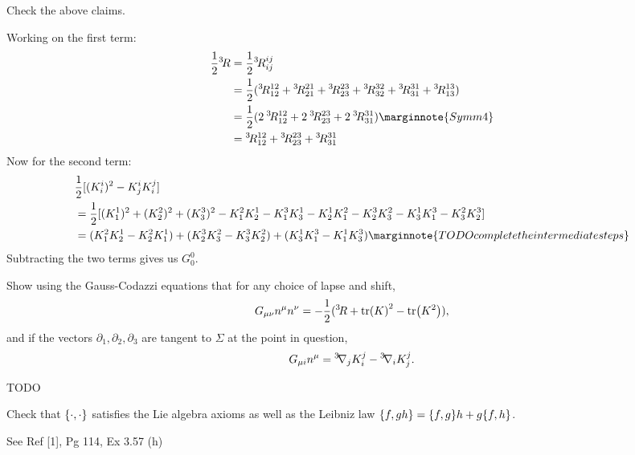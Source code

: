 \documentclass[10pt]{article}
\begin{document}
\begin{example}
	Check the above claims.
\end{example}
\sol Working on the first term:
$$
\begin{aligned}
	\frac12 \nt R &= \frac12 \nt R_{ij}^{ij}\\
	&= \frac12 (\nt R_{12}^{12} + \nt R_{21}^{21} + \nt R_{23}^{23} + \nt R_{32}^{32} + \nt R_{31}^{31} + \nt R_{13}^{13})\\
	&= \frac12 (2 \:\nt R_{12}^{12} + 2 \:\nt R_{23}^{23} + 2 \:\nt R_{31}^{31})\marginnote{Symm 4}\\
	&= \nt R_{12}^{12} + \nt R_{23}^{23} + \nt R_{31}^{31}\\
\end{aligned}
$$
Now for the second term:
$$
\begin{aligned}
	&\frac12[(K_i^i)^2 - K_j^iK_i^j]\\
	&= \frac12[(K_1^1)^2 + (K_2^2)^2 + (K_3^3)^2 - K_1^2K_2^1 - K_1^3K_3^1 - K_2^1K_1^2 - K_2^3K_3^2 - K_3^1K_1^3 - K_3^2K_2^3]\\
	&= (K_1^2K_2^1 - K_2^2K_1^1) + (K_2^3K_3^2 - K_3^3K_2^2) + (K_3^1K_1^3 - K_1^1K_3^3)\marginnote{TODO complete the intermediate steps}
\end{aligned}
$$
Subtracting the two terms gives us $G_0^0$.


\label{b3e46}\begin{example}
	Show using the Gauss-Codazzi equations that for any choice of lapse and shift,
	$$
	G_{\mu\nu}n^\mu n^\nu = -\frac12({}^3\! R + \tr(K)^2 - \tr(K^2)),
	$$
	and if the vectors $\partial_1,\partial_2,\partial_3$ are tangent to $\Sigma$ at the point in question,
	$$
	G_{\mu i}n^\mu = {}^3\!\nabla_j K_i^j - {}^3\!\nabla_i K_j^j.
	$$
\end{example}
\sol TODO


\begin{example}
	Check that $\lbrace\cdot,\cdot\rbrace$ satisfies the Lie algebra axioms as well as the Leibniz law $\lbrace f,gh\rbrace = \lbrace f,g\rbrace h+g\lbrace f,h\rbrace$.
\end{example}
\sol See Ref [1], Pg 114, Ex 3.57 (h)
\end{document}
